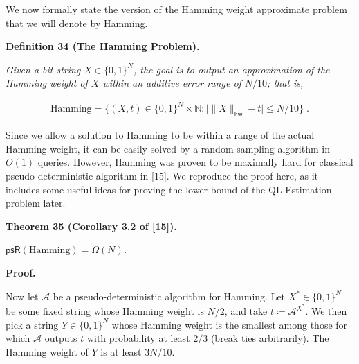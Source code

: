\documentclass[10pt,a4paper]{article}
\begin{document}
We now formally state the version of the Hamming weight approximate problem that we will denote by Hamming.\par





\par\medskip\noindent\textbf{
\textbf{Definition 34}\textbf{ }(The Hamming Problem)\textbf{.}
}\par



\emph{Given a bit string $X\in\{0,1\}^{N}$, the goal is to output an approximation of the Hamming weight of $X$ within an additive error range of $N/10$; that is,}\par


\[\begin{gathered}
\displaystyle{\text{Hamming}}=\{(X,t)\in\{0,1\}^{N}\times\mathbb{N}:\big|\|X\|_{\mathsf{hw}}-t\big|\leq N/10\}\;.
\end{gathered}\]






Since we allow a solution to Hamming to be within a range of the actual Hamming weight, it can be easily solved by a random sampling algorithm in $O(1)$ queries.
However, Hamming was proven to be maximally hard for classical pseudo-deterministic algorithm in [15]. We reproduce the proof here, as it includes some useful ideas for proving the lower bound of the QL-Estimation problem later.\par





\par\medskip\noindent\textbf{
\textbf{Theorem 35}\textbf{ }(Corollary 3.2 of [15])\textbf{.}
}\par



$\mathsf{psR}({\text{Hamming}})=\Omega(N)$\emph{.}\par







\par\medskip\noindent\textbf{Proof.}\par




Now let $\mathcal{A}$ be a pseudo-deterministic algorithm for Hamming.
Let $X^{*}\in\{0,1\}^{N}$ be some fixed string whose Hamming weight is $N/2$, and take
$t\coloneqq\mathcal{A}^{X^{*}}$. We then pick a string $Y\in\{0,1\}^{N}$ whose Hamming weight is the smallest among those for which $\mathcal{A}$ outputs $t$ with probability at least $2/3$ (break ties arbitrarily).
The Hamming weight of $Y$ is at least $3N/10$.\par
\end{document}
